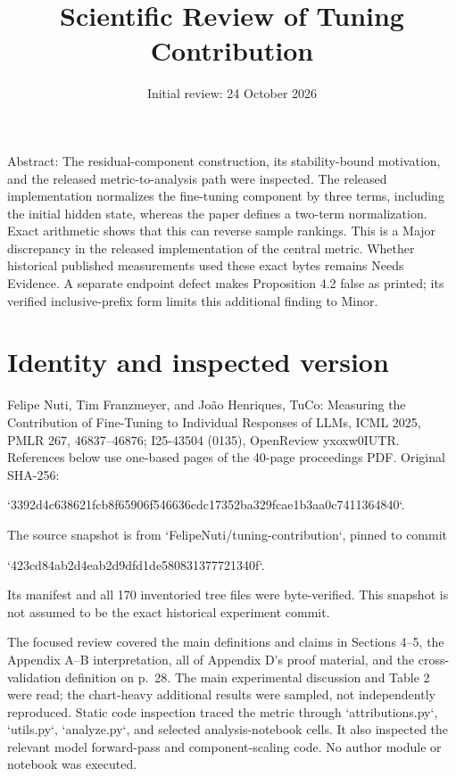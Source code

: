 \documentclass[10pt]{article}
\title{Scientific Review of Tuning Contribution}
\author{}
\date{Initial review: 24 October 2026}
\begin{document}
\maketitle
Abstract: The residual-component construction, its stability-bound motivation, and the released metric-to-analysis path were inspected. The released implementation normalizes the fine-tuning component by three terms, including the initial hidden state, whereas the paper defines a two-term normalization. Exact arithmetic shows that this can reverse sample rankings. This is a Major discrepancy in the released implementation of the central metric. Whether historical published measurements used these exact bytes remains Needs Evidence. A separate endpoint defect makes Proposition 4.2 false as printed; its verified inclusive-prefix form limits this additional finding to Minor.\par
\section*{Identity and inspected version}
Felipe Nuti, Tim Franzmeyer, and João Henriques, TuCo: Measuring the Contribution of Fine-Tuning to Individual Responses of LLMs, ICML 2025, PMLR 267, 46837–46876; I25-43504 (0135), OpenReview yxoxw0IUTR. References below use one-based pages of the 40-page proceedings PDF. Original SHA-256:\par
`3392d4c638621fcb8f65906f546636cdc17352ba329fcae1b3aa0c7411364840`.\par
The source snapshot is from `FelipeNuti/tuning-contribution`, pinned to commit\par
`423cd84ab2d4eab2d9dfd1de580831377721340f`.\par
Its manifest and all 170 inventoried tree files were byte-verified. This snapshot is not assumed to be the exact historical experiment commit.\par
The focused review covered the main definitions and claims in Sections 4–5, the Appendix A–B interpretation, all of Appendix D’s proof material, and the cross-validation definition on p. 28. The main experimental discussion and Table 2 were read; the chart-heavy additional results were sampled, not independently reproduced. Static code inspection traced the metric through `attributions.py`, `utils.py`, `analyze.py`, and selected analysis-notebook cells. It also inspected the relevant model forward-pass and component-scaling code. No author module or notebook was executed.\par
\end{document}

